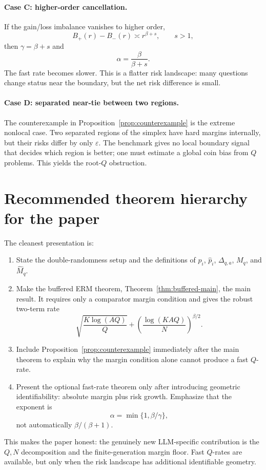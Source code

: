 \documentclass[11pt]{article}
\newcommand{\eps}{\varepsilon}
\begin{document}
\paragraph{Case C: higher-order cancellation.}
If the gain/loss imbalance vanishes to higher order,
\[
B_+(r)-B_-(r)\asymp r^{\beta+s},
\qquad s>1,
\]
then $\gamma=\beta+s$ and
\[
\alpha=\frac{\beta}{\beta+s}.
\]
The fast rate becomes slower.  This is a flatter risk landscape: many questions change status near the boundary, but the net risk difference is small.

\paragraph{Case D: separated near-tie between two regions.}
The counterexample in Proposition~\ref{prop:counterexample} is the extreme nonlocal case.  Two separated regions of the simplex have hard margins internally, but their risks differ by only $\eps$.  The benchmark gives no local boundary signal that decides which region is better; one must estimate a global coin bias from $Q$ problems.  This yields the root-$Q$ obstruction.

\section{Recommended theorem hierarchy for the paper}

The cleanest presentation is:

\begin{enumerate}[label=(\roman*)]
\item State the double-randomness setup and the definitions of $p_i$, $\widehat p_i$, $\Delta_{q,a}$, $M_q$, and $\widehat M_q$.

\item Make the buffered ERM theorem, Theorem~\ref{thm:buffered-main}, the main result.  It requires only a comparator margin condition and gives the robust two-term rate
\[
\sqrt{\frac{K\log(AQ)}{Q}}
+
\left(\frac{\log(KAQ)}{N}\right)^{\beta/2}.
\]

\item Include Proposition~\ref{prop:counterexample} immediately after the main theorem to explain why the margin condition alone cannot produce a fast $Q$-rate.

\item Present the optional fast-rate theorem only after introducing geometric identifiability: absolute margin plus risk growth.  Emphasize that the exponent is
\[
\alpha=\min\{1,\beta/\gamma\},
\]
not automatically $\beta/(\beta+1)$.
\end{enumerate}

This makes the paper honest: the genuinely new LLM-specific contribution is the $Q,N$ decomposition and the finite-generation margin floor.  Fast $Q$-rates are available, but only when the risk landscape has additional identifiable geometry.
\end{document}
